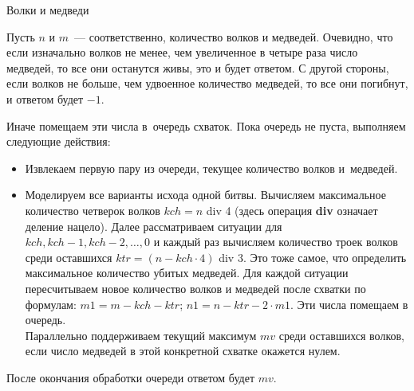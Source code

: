 \begin{tutorial}{Волки и медведи}

Пусть $n$ и $m$~--- соответственно, количество волков и медведей. Очевидно, что если изначально волков не менее, чем увеличенное в четыре раза число медведей, то все они останутся живы, это и будет ответом. С другой стороны, если волков не больше, чем удвоенное количество медведей, то все они погибнут, и ответом будет $-1$.

Иначе помещаем эти числа в~очередь схваток. Пока очередь не пуста, выполняем следующие действия:
\begin{itemize}
\item Извлекаем первую пару из очереди, текущее количество волков и~медведей. 
\item Моделируем все варианты исхода одной битвы. Вычисляем максимальное количество четверок волков $kch=n$ div 4 (здесь операция \textbf{div} означает деление нацело). Далее рассматриваем ситуации для $kch, kch-1, kch-2, \dots, 0$ и каждый раз вычисляем количество троек волков среди оставшихся $ktr = (n - kch \cdot 4)$ div 3. Это тоже самое, что определить максимальное количество убитых медведей. Для каждой ситуации пересчитываем новое количество волков и медведей после схватки по формулам: $m1=m-kch-ktr$; $n1=n-ktr-2\cdot m1$. Эти числа помещаем в очередь.\\
Параллельно поддерживаем текущий максимум $mv$ среди оставшихся волков, если число медведей в этой конкретной схватке окажется нулем.  
\end{itemize}
После окончания обработки очереди ответом будет $mv$.



\end{tutorial}
